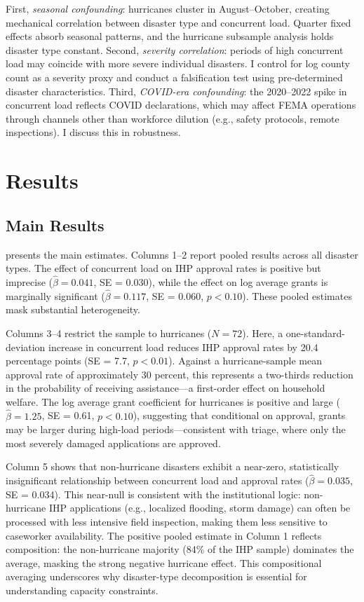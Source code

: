 \documentclass[12pt]{article}
\begin{document}
First, \textit{seasonal confounding}: hurricanes cluster in August--October, creating mechanical correlation between disaster type and concurrent load. Quarter fixed effects absorb seasonal patterns, and the hurricane subsample analysis holds disaster type constant. Second, \textit{severity correlation}: periods of high concurrent load may coincide with more severe individual disasters. I control for log county count as a severity proxy and conduct a falsification test using pre-determined disaster characteristics. Third, \textit{COVID-era confounding}: the 2020--2022 spike in concurrent load reflects COVID declarations, which may affect FEMA operations through channels other than workforce dilution (e.g., safety protocols, remote inspections). I discuss this in robustness.

\section{Results}

\subsection{Main Results}

 presents the main estimates. Columns 1--2 report pooled results across all disaster types. The effect of concurrent load on IHP approval rates is positive but imprecise ($\hat{\beta} = 0.041$, SE = 0.030), while the effect on log average grants is marginally significant ($\hat{\beta} = 0.117$, SE = 0.060, $p < 0.10$). These pooled estimates mask substantial heterogeneity.

Columns 3--4 restrict the sample to hurricanes ($N = 72$). Here, a one-standard-deviation increase in concurrent load reduces IHP approval rates by 20.4 percentage points (SE = 7.7, $p < 0.01$). Against a hurricane-sample mean approval rate of approximately 30 percent, this represents a two-thirds reduction in the probability of receiving assistance---a first-order effect on household welfare. The log average grant coefficient for hurricanes is positive and large ($\hat{\beta} = 1.25$, SE = 0.61, $p < 0.10$), suggesting that conditional on approval, grants may be larger during high-load periods---consistent with triage, where only the most severely damaged applications are approved.

Column 5 shows that non-hurricane disasters exhibit a near-zero, statistically insignificant relationship between concurrent load and approval rates ($\hat{\beta} = 0.035$, SE = 0.034). This near-null is consistent with the institutional logic: non-hurricane IHP applications (e.g., localized flooding, storm damage) can often be processed with less intensive field inspection, making them less sensitive to caseworker availability. The positive pooled estimate in Column 1 reflects composition: the non-hurricane majority (84\% of the IHP sample) dominates the average, masking the strong negative hurricane effect. This compositional averaging underscores why disaster-type decomposition is essential for understanding capacity constraints.
\end{document}
